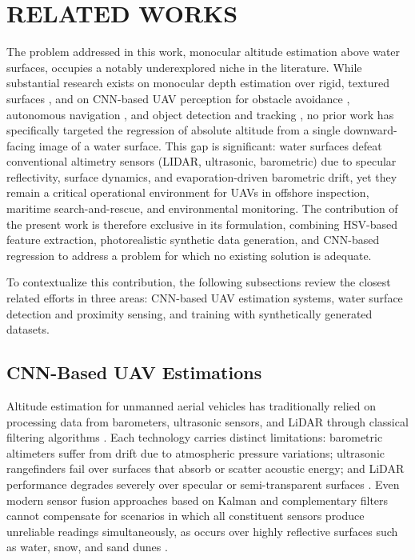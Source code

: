 \section{RELATED WORKS}

    The problem addressed in this work, monocular altitude estimation above water surfaces, occupies a notably underexplored niche in the literature.
    While substantial research exists on monocular depth estimation over rigid, textured surfaces \cite{MonocularDepth} \cite{Joglekar2011DepthEU}, and on CNN-based UAV perception for obstacle avoidance \cite{CNNSingleImageQuadrotor} \cite{AircraftColAvoid}, autonomous navigation \cite{ByMySelf}, and object detection and tracking \cite{SurveyObjDetectionTracking} \cite{OpticalFlowStereo}, no prior work has specifically targeted the regression of absolute altitude from a single downward-facing image of a water surface.
    This gap is significant: water surfaces defeat conventional altimetry sensors (LIDAR, ultrasonic, barometric) due to specular reflectivity, surface dynamics, and evaporation-driven barometric drift, yet they remain a critical operational environment for UAVs in offshore inspection, maritime search-and-rescue, and environmental monitoring.
    The contribution of the present work is therefore exclusive in its formulation, combining HSV-based feature extraction, photorealistic synthetic data generation, and CNN-based regression to address a problem for which no existing solution is adequate.

    To contextualize this contribution, the following subsections review the closest related efforts in three areas: CNN-based UAV estimation systems, water surface detection and proximity sensing, and training with synthetically generated datasets.

    \subsection{CNN-Based UAV Estimations}

    Altitude estimation for unmanned aerial vehicles has traditionally relied on processing data from barometers, ultrasonic sensors, and LiDAR through classical filtering algorithms \cite{MonocularDepth}.
    Each technology carries distinct limitations: barometric altimeters suffer from drift due to atmospheric pressure variations; ultrasonic rangefinders fail over surfaces that absorb or scatter acoustic energy; and LiDAR performance degrades severely over specular or semi-transparent surfaces \cite{FiltroKalmanAltitude}.
    Even modern sensor fusion approaches based on Kalman and complementary filters cannot compensate for scenarios in which all constituent sensors produce unreliable readings simultaneously, as occurs over highly reflective surfaces such as water, snow, and sand dunes \cite{WeatherConstraints}.

